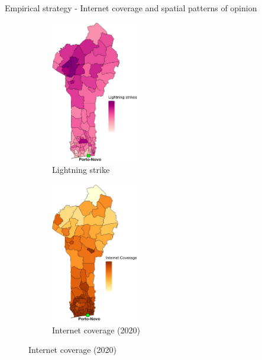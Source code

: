 \documentclass[10pt]{beamer}
\begin{document}
\begin{frame}{{\fontsize{13}{12}\selectfont
    Empirical strategy - Internet coverage and spatial patterns of opinion}}
    \begin{figure}
        \centering
        \caption{Example: Benin Lightning strike and Internet Coverage}
        
        \begin{subfigure}{0.45\textwidth}
            \centering
            \includegraphics[width=3.8cm]{lightning_strikes.jpg}
            \caption{Lightning strike}
        \end{subfigure}
        \hspace{0.02\textwidth}
        \begin{subfigure}{0.45\textwidth}
            \centering
            \includegraphics[width=3.8cm]{internet_coverage_w8.jpg}
            \caption{Internet coverage (2020)}
        \end{subfigure}        
    \end{figure}
\end{frame}
\end{document}
